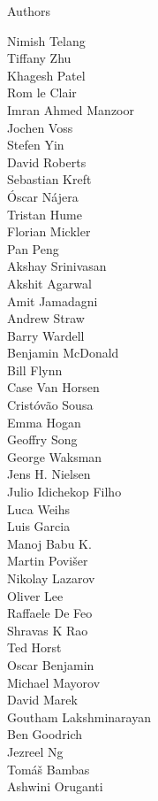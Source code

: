 \documentclass[xcolor=svgnames]{beamer}
\begin{document}
\begin{frame}{Authors}
\begin{multicols}{5}
\tiny
Nimish Telang\\
Tiffany Zhu\\
Khagesh Patel\\
Rom le Clair\\
Imran Ahmed Manzoor\\
Jochen Voss\\
Stefen Yin\\
David Roberts\\
Sebastian Kreft\\
Óscar Nájera\\
Tristan Hume\\
Florian Mickler\\
Pan Peng\\
Akshay Srinivasan\\
Akshit Agarwal\\
Amit Jamadagni\\
Andrew Straw\\
Barry Wardell\\
Benjamin McDonald\\
Bill Flynn\\
Case Van Horsen\\
Cristóvão Sousa\\
Emma Hogan\\
Geoffry Song\\
George Waksman\\
Jens H. Nielsen\\
Julio Idichekop Filho\\
Luca Weihs\\
Luis Garcia\\
Manoj Babu K.\\
Martin Povišer\\
Nikolay Lazarov\\
Oliver Lee\\
Raffaele De Feo\\
Shravas K Rao\\
Ted Horst\\
Oscar Benjamin\\
Michael Mayorov\\
David Marek\\
Goutham Lakshminarayan\\
Ben Goodrich\\
Jezreel Ng\\
Tomáš Bambas\\
Ashwini Oruganti\\

\end{multicols}
\end{frame}
\end{document}
